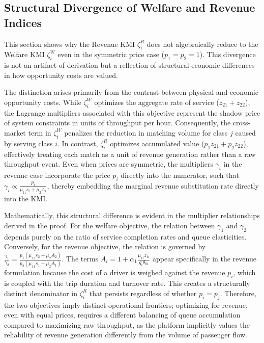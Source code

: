 \subsection{Structural Divergence of Welfare and Revenue Indices}
\label{sec:ec_kmi_difference}

This section shows why the Revenue KMI $\zeta_i^R$ does not algebraically reduce to the Welfare KMI $\zeta_i^W$ even in the symmetric price case ($p_1=p_2=1$).
This divergence is not an artifact of derivation but a reflection of structural economic differences in how opportunity costs are valued.

The distinction arises primarily from the contrast between physical and economic opportunity costs.
While $\zeta_i^W$ optimizes the aggregate rate of service ($z_{21} + z_{22}$), the Lagrange multipliers associated with this objective represent the shadow price of system constraints in units of throughput per hour.
Consequently, the cross-market term in $\zeta_i^W$ penalizes the reduction in matching volume for class $j$ caused by serving class $i$.
In contrast, $\zeta_i^R$ optimizes accumulated value ($p_1 z_{21} + p_2 z_{22}$), effectively treating each match as a unit of revenue generation rather than a raw throughput event.
Even when prices are symmetric, the multipliers $\gamma_i$ in the revenue case incorporate the price $p_i$ directly into the numerator, such that $\gamma_i \propto \frac{p_i}{\mu_{1i} s_i + \mu_2 A_i}$, thereby embedding the marginal revenue substitution rate directly into the KMI.

Mathematically, this structural difference is evident in the multiplier relationships derived in the proof.
For the welfare objective, the relation between $\gamma_1$ and $\gamma_2$ depends purely on the ratio of service completion rates and queue elasticities.
Conversely, for the revenue objective, the relation is governed by $\frac{\gamma_1}{\gamma_2} = \frac{p_1 (\mu_{12} s_2 + \mu_2 A_2)}{p_2 (\mu_{11} s_1 + \mu_2 A_1)}$.
The terms $A_i = 1 + \alpha_1 \frac{\mu_{1i} z_{1i}}{q_i \theta_{0i}}$ appear specifically in the revenue formulation because the cost of a driver is weighed against the revenue $p_i$, which is coupled with the trip duration and turnover rate.
This creates a structurally distinct denominator in $\zeta_i^R$ that persists regardless of whether $p_i = p_j$.
Therefore, the two objectives imply distinct operational frontiers; optimizing for revenue, even with equal prices, requires a different balancing of queue accumulation compared to maximizing raw throughput, as the platform implicitly values the reliability of revenue generation differently from the volume of passenger flow.


